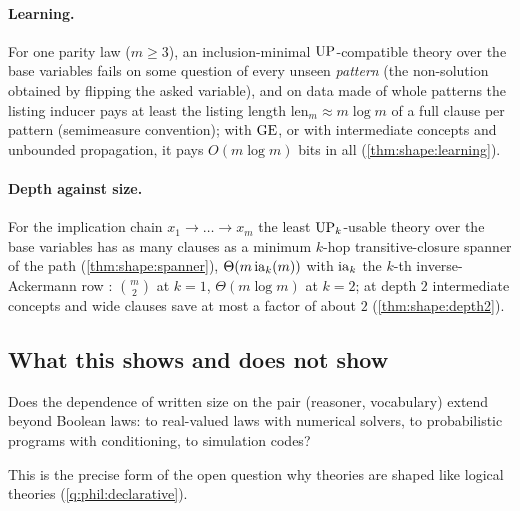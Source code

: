 \paragraph{Learning.}\label{sec:shape:learning} For one parity law ($m\ge3$), an inclusion-minimal $\mathrm{UP}$-compatible theory over the base variables fails on some question of every unseen \emph{pattern} (the non-solution obtained by flipping the asked variable), and on data made of whole patterns the listing inducer pays at least the listing length $\mathrm{len}_m\approx m\log m$ of a full clause per pattern (semimeasure convention); with $\mathrm{GE}$, or with intermediate concepts and unbounded propagation, it pays $O(m\log m)$ bits in all (\cref{thm:shape:learning}).

\paragraph{Depth against size.} For the implication chain $x_1\to\dots\to x_m$ the least $\mathrm{UP}_k$-usable theory over the base variables has as many clauses as a minimum $k$-hop transitive-closure spanner of the path (\cref{thm:shape:spanner}), $\Theta(m\,\mathrm{ia}_k(m))$ with $\mathrm{ia}_k$ the $k$-th inverse-Ackermann row \citep{alon1987optimal,bhattacharyya2012transitive}: $\binom m2$ at $k=1$, $\Theta(m\log m)$ at $k=2$; at depth $2$ intermediate concepts and wide clauses save at most a factor of about $2$ (\cref{thm:shape:depth2}).

\subsection{What this shows and does not show}\label{sec:shape:reading}

\begin{question}\label{q:shape:beyond}
Does the dependence of written size on the pair (reasoner, vocabulary) extend beyond Boolean laws: to real-valued laws with numerical solvers, to probabilistic programs with conditioning, to simulation codes?
\end{question}

This is the precise form of the open question why theories are shaped like logical theories (\cref{q:phil:declarative}).

